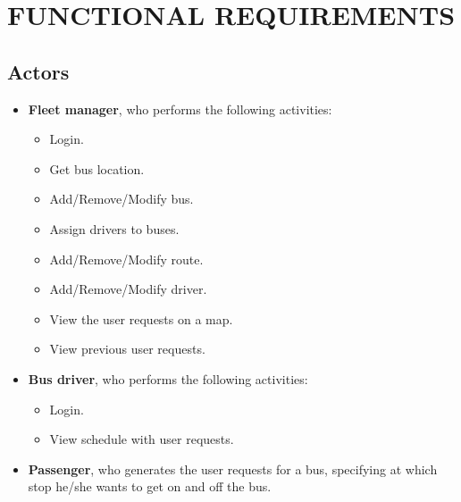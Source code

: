\section{FUNCTIONAL REQUIREMENTS}
\subsection{Actors}
\begin{itemize}
	\item \textbf{Fleet manager}, who performs the following activities:
	\begin{itemize}
		\item Login.
		\item Get bus location.
		\item Add/Remove/Modify bus.
		\item Assign drivers to buses.
		\item Add/Remove/Modify route.
		\item Add/Remove/Modify driver.
		\item View the user requests on a map.
		\item View previous user requests.
	\end{itemize}
\item \textbf{Bus driver}, who performs the following activities:
\begin{itemize}
	\item Login.
	\item View schedule with user requests.
\end{itemize}
\item \textbf{Passenger}, who generates the user requests for a bus, specifying at which stop he/she wants to get on and off the bus.
\end{itemize}
\newpage
